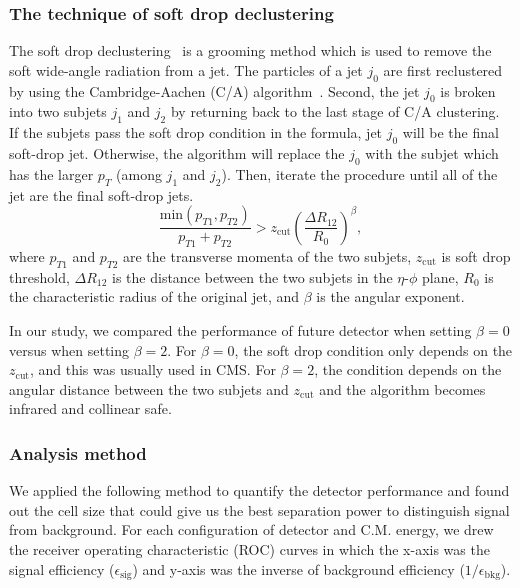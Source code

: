 \documentclass[12pt,twoside,a4paper,an,final]{cms-tdr}
\begin{document}
\subsubsection{The technique of soft drop declustering}
The soft drop declustering~\cite{Larkoski:2014wba} is a grooming method 
which is used to remove the soft wide-angle radiation from a jet. The particles of a jet 
$j_0$ are first reclustered by using the Cambridge-Aachen
 (C/A) algorithm~\cite{Dokshitzer:1997in,Wobisch:1998wt}. Second, the jet $j_0$ 
is broken into two subjets $j_1$ and $j_2$ by returning back to the last stage of C/A 
clustering.
If the subjets pass the soft drop condition in the formula, jet $j_0$ will be the final 
soft-drop jet. Otherwise, the algorithm will replace the $j_0$ with the subjet which has the 
larger $p_T$ (among $j_1$ and $j_2$). Then, iterate the procedure until all of the jet are the final soft-drop jets.
\begin{equation} \label{eq:soft-drop}
\frac{\mathrm{min}(p_{T1},p_{T2})}{p_{T1}+p_{T2}}>z_\mathrm{cut}(\frac{\Delta R_{12}}{R_{0}})^{\beta},
\end{equation}
where $p_{T1}$ and $p_{T2}$ are the transverse momenta of the two subjets, 
$z_\mathrm{cut}$ is soft drop threshold, 
$\Delta R_{12}$ is the distance between the two subjets in the $\eta$-$\phi$ 
plane, $R_0$ is the characteristic radius of the original jet, and $\beta$ is 
the angular exponent.

In our study, we compared the performance of future detector when setting 
$\beta=0$ versus when setting $\beta=2$. For $\beta=0$, the soft drop condition 
only depends on the $z_\mathrm{cut}$, and this was usually used in CMS. For $\beta=2$, the condition depends on 
the angular distance between the two subjets and $z_\mathrm{cut}$ and the 
algorithm becomes infrared and collinear safe. 

\subsubsection{Analysis method}\label{Analysis_method}
We applied the following method to quantify the detector performance and 
found out the cell size that could give us the best separation power to distinguish 
signal from background. For each configuration of detector and C.M. energy, 
we drew the receiver operating characteristic (ROC) curves in which the x-axis
 was the signal efficiency ($\epsilon_\mathrm{sig}$) and y-axis was the inverse 
of background efficiency ($1/\epsilon_\mathrm{bkg}$). \\
\end{document}
